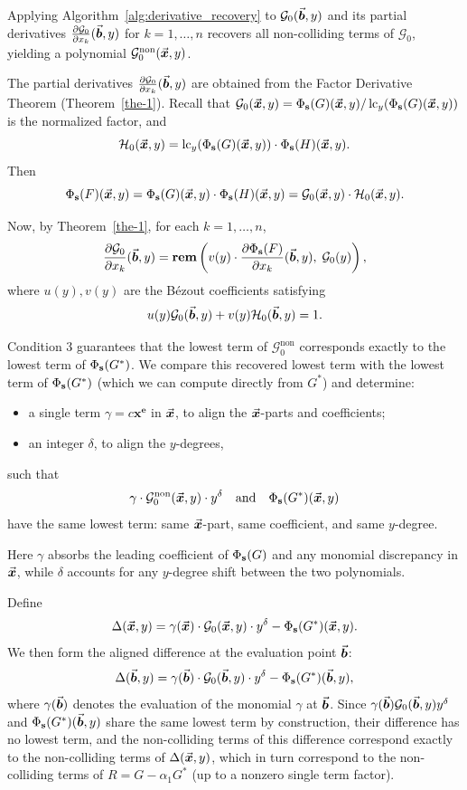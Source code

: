 \documentclass{article}
\numberwithin{equation}{section}
\begin{document}
Applying Algorithm~\ref{alg:derivative_recovery} to $\mathcal{G}_0(\vec{\boldsymbol{b}}, y)$ and its partial derivatives 
$\frac{\partial \mathcal{G}_0}{\partial x_k}(\vec{\boldsymbol{b}}, y)$ for $k=1,\dots,n$ recovers all non-colliding terms of $\mathcal{G}_0$, yielding a polynomial $\mathcal{G}_0^{\text{non}}(\vec{\boldsymbol{x}}, y)$.

The partial derivatives $\frac{\partial \mathcal{G}_0}{\partial x_k}(\vec{\boldsymbol{b}}, y)$ are obtained from the Factor Derivative Theorem (Theorem~\ref{the-1}). Recall that $\mathcal{G}_0(\vec{\boldsymbol{x}}, y) = \Phi_{\mathbf{s}}(G)(\vec{\boldsymbol{x}}, y) / \operatorname{lc}_y(\Phi_{\mathbf{s}}(G)(\vec{\boldsymbol{x}}, y))$ is the normalized factor, and
\[
\mathcal{H}_0(\vec{\boldsymbol{x}}, y) = \operatorname{lc}_y(\Phi_{\mathbf{s}}(G)(\vec{\boldsymbol{x}}, y)) \cdot \Phi_{\mathbf{s}}(H)(\vec{\boldsymbol{x}}, y) .
\]
Then 
\[
\Phi_{\mathbf{s}}(F)(\vec{\boldsymbol{x}}, y) = \Phi_{\mathbf{s}}(G)(\vec{\boldsymbol{x}}, y) \cdot \Phi_{\mathbf{s}}(H)(\vec{\boldsymbol{x}}, y)=\mathcal{G}_0(\vec{\boldsymbol{x}}, y) \cdot \mathcal{H}_0(\vec{\boldsymbol{x}}, y).
\]

Now, by Theorem~\ref{the-1}, for each $k = 1,\dots,n$,
\[
\frac{\partial \mathcal{G}_0}{\partial x_k}(\vec{\boldsymbol{b}}, y)
=
\mathbf{rem}\left(v(y) \cdot \frac{\partial \Phi_{\mathbf{s}}(F)}{\partial x_k}(\vec{\boldsymbol{b}}, y),\; \mathcal{G}_0(y)\right),
\]
where $u(y), v(y)$ are the B\'ezout coefficients satisfying
\[
u(y) \mathcal{G}_0(\vec{\boldsymbol{b}},y) + v(y) \mathcal{H}_0(\vec{\boldsymbol{b}},y) = 1.
\]


Condition 3 guarantees that the lowest term of $\mathcal{G}_0^{\text{non}}$ corresponds exactly to the lowest term of $\Phi_{\mathbf{s}}(G^*)$. We compare this recovered lowest term with the lowest term of $\Phi_{\mathbf{s}}(G^*)$ (which we can compute directly from $G^*$) and determine:
\begin{itemize}
    \item a single term $\gamma = c \mathbf{x}^{\mathbf{e}}$ in $\vec{\boldsymbol{x}}$, to align the $\vec{\boldsymbol{x}}$-parts and coefficients;
    \item an integer $\delta$, to align the $y$-degrees,
\end{itemize}
such that
\[
\gamma \cdot \mathcal{G}_0^{\text{non}}(\vec{\boldsymbol{x}}, y) \cdot y^{\delta} \quad \text{and} \quad \Phi_{\mathbf{s}}(G^*)(\vec{\boldsymbol{x}}, y)
\]
have the same lowest term: same $\vec{\boldsymbol{x}}$-part, same coefficient, and same $y$-degree.

Here $\gamma$ absorbs the leading coefficient of $\Phi_{\mathbf{s}}(G)$ and any monomial discrepancy in $\vec{\boldsymbol{x}}$, while $\delta$ accounts for any $y$-degree shift between the two polynomials.


Define 
\[
\Delta(\vec{\boldsymbol{x}}, y) = \gamma(\vec{\boldsymbol{x}}) \cdot \mathcal{G}_0(\vec{\boldsymbol{x}}, y) \cdot y^{\delta} - \Phi_{\mathbf{s}}(G^*)(\vec{\boldsymbol{x}}, y).
\]
We then form the aligned difference at the evaluation point $\vec{\boldsymbol{b}}$:
\[
\Delta(\vec{\boldsymbol{b}}, y) = \gamma(\vec{\boldsymbol{b}}) \cdot \mathcal{G}_0(\vec{\boldsymbol{b}}, y) \cdot y^{\delta} - \Phi_{\mathbf{s}}(G^*)(\vec{\boldsymbol{b}}, y),
\]
where $\gamma(\vec{\boldsymbol{b}})$ denotes the evaluation of the monomial $\gamma$ at $\vec{\boldsymbol{b}}$. Since $\gamma(\vec{\boldsymbol{b}}) \mathcal{G}_0(\vec{\boldsymbol{b}}, y) y^{\delta}$ and $\Phi_{\mathbf{s}}(G^*)(\vec{\boldsymbol{b}}, y)$ share the same lowest term by construction, their difference has no lowest term, and the non-colliding terms of this difference correspond exactly to the non-colliding terms of $\Delta(\vec{\boldsymbol{x}},y)$, which in turn correspond to the non-colliding terms of $R = G - \alpha_1 G^*$ (up to a nonzero single term factor). 
\end{document}
